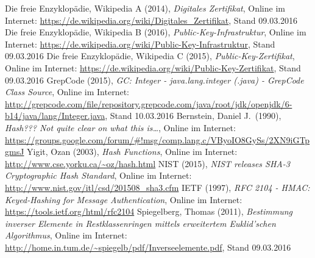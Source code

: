 \documentclass[a4paper, fontsize=12pt, parskip=full, toc=bibliographynumbered]{scrreprt}
\begin{document}
\begin{thebibliography}{9}
 Die freie Enzyklopädie, Wikipedia A (2014), \emph{Digitales Zertifikat}, Online im Internet: \url{https://de.wikipedia.org/wiki/Digitales_Zertifikat}, Stand 09.03.2016
 Die freie Enzyklopädie, Wikipedia B (2016), \emph{Public-Key-Infrastruktur}, Online im Internet: \url{https://de.wikipedia.org/wiki/Public-Key-Infrastruktur}, Stand 09.03.2016
 Die freie Enzyklopädie, Wikipedia C (2015), \emph{Public-Key-Zertifikat}, Online im Internet: \url{https://de.wikipedia.org/wiki/Public-Key-Zertifikat}, Stand 09.03.2016
 GrepCode (2015), \emph{GC: Integer -
    java.lang.integer (.java) - GrepCode Class Source}, Online im
  Internet:
  \url{http://grepcode.com/file/repository.grepcode.com/java/root/jdk/openjdk/6-b14/java/lang/Integer.java},
  Stand 10.03.2016
 Bernstein, Daniel J.~(1990), \emph{Hash??? Not
    quite clear on what this is\ldots}, Online im Internet: \url{https://groups.google.com/forum/\#!msg/comp.lang.c/VByoIO8GySs/2XN9iGTpgmsJ}
 Yigit, Ozan (2003), \emph{Hash Functions}, Online
  im Internet: \url{http://www.cse.yorku.ca/~oz/hash.html}
 NIST (2015), \emph{NIST releases SHA-3
    Cryptographic Hash Standard}, Online im Internet: \url{http://www.nist.gov/itl/csd/201508_sha3.cfm}
 IETF (1997), \emph{RFC 2104 - HMAC: Keyed-Hashing
    for Message Authentication}, Online im Internet: \url{https://tools.ietf.org/html/rfc2104}
 Spiegelberg, Thomas (2011), \emph{Bestimmung inverser Elemente in Restklassenringen mittels erweitertem Euklid'schen Algorithmus}, Online im Internet: \url{http://home.in.tum.de/~spiegelb/pdf/Inverseelemente.pdf}, Stand 09.03.2016
\end{thebibliography}
\end{document}
